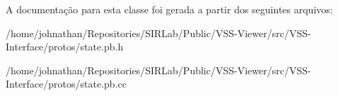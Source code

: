 A documentação para esta classe foi gerada a partir dos seguintes arquivos\+:\begin{DoxyCompactItemize}
\item 
/home/johnathan/\+Repositories/\+S\+I\+R\+Lab/\+Public/\+V\+S\+S-\/\+Viewer/src/\+V\+S\+S-\/\+Interface/protos/state.\+pb.\+h\item 
/home/johnathan/\+Repositories/\+S\+I\+R\+Lab/\+Public/\+V\+S\+S-\/\+Viewer/src/\+V\+S\+S-\/\+Interface/protos/state.\+pb.\+cc\end{DoxyCompactItemize}
